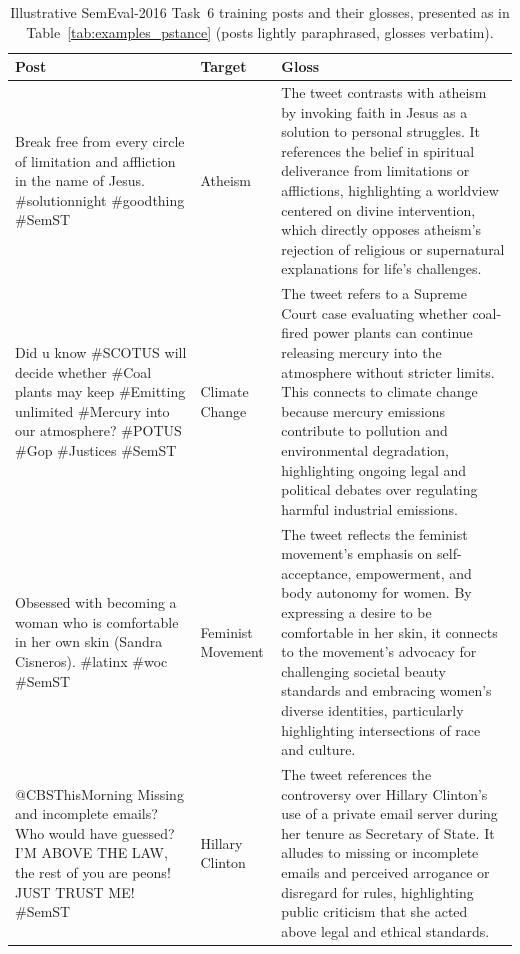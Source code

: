 \documentclass[pdflatex,sn-mathphys-num,iicol]{sn-jnl}%
\begin{document}
\begin{table}[p]
	\caption{Illustrative SemEval-2016 Task~6 training posts and their glosses, presented as in Table~\ref{tab:examples_pstance} (posts lightly paraphrased, glosses verbatim).}
	\label{tab:examples_semeval}
	\centering
	\tablebodyfont{}
	\setlength{\tabcolsep}{5pt}
	\renewcommand{\arraystretch}{1.12}
	\begin{tabular}{@{}L{0.295\textwidth}L{0.105\textwidth}L{0.525\textwidth}@{}}
		\toprule
		\textbf{Post} & \textbf{Target} & \textbf{Gloss} \\
		\midrule
		Break free from every circle of limitation and affliction in the name of Jesus. \#solutionnight \#goodthing \#SemST & Atheism & The tweet contrasts with atheism by invoking faith in Jesus as a solution to personal struggles. It references the belief in spiritual deliverance from limitations or afflictions, highlighting a worldview centered on divine intervention, which directly opposes atheism's rejection of religious or supernatural explanations for life's challenges. \\
		\addlinespace[3pt]
		Did u know \#SCOTUS will decide whether \#Coal plants may keep \#Emitting unlimited \#Mercury into our atmosphere? \#POTUS \#Gop \#Justices \#SemST & Climate Change & The tweet refers to a Supreme Court case evaluating whether coal-fired power plants can continue releasing mercury into the atmosphere without stricter limits. This connects to climate change because mercury emissions contribute to pollution and environmental degradation, highlighting ongoing legal and political debates over regulating harmful industrial emissions. \\
		\addlinespace[3pt]
		Obsessed with becoming a woman who is comfortable in her own skin (Sandra Cisneros). \#latinx \#woc \#SemST & Feminist Movement & The tweet reflects the feminist movement's emphasis on self-acceptance, empowerment, and body autonomy for women. By expressing a desire to be comfortable in her skin, it connects to the movement's advocacy for challenging societal beauty standards and embracing women's diverse identities, particularly highlighting intersections of race and culture. \\
		\addlinespace[3pt]
		@CBSThisMorning Missing and incomplete emails? Who would have guessed? I'M ABOVE THE LAW, the rest of you are peons! JUST TRUST ME! \#SemST & Hillary Clinton & The tweet references the controversy over Hillary Clinton's use of a private email server during her tenure as Secretary of State. It alludes to missing or incomplete emails and perceived arrogance or disregard for rules, highlighting public criticism that she acted above legal and ethical standards. \\

\end{tabular}
\end{table}
\end{document}
